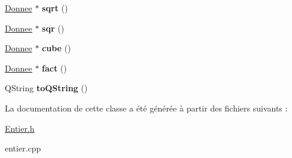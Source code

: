 \begin{DoxyCompactItemize}
\item 
\hypertarget{class_entier_a207294a4cb8da36d6ea5ab61a9dd29a5}{\hyperlink{class_donnee}{Donnee} $\ast$ {\bfseries sqrt} ()}\label{class_entier_a207294a4cb8da36d6ea5ab61a9dd29a5}

\item 
\hypertarget{class_entier_af2206ecf5e7d67b3643e656df2a9734c}{\hyperlink{class_donnee}{Donnee} $\ast$ {\bfseries sqr} ()}\label{class_entier_af2206ecf5e7d67b3643e656df2a9734c}

\item 
\hypertarget{class_entier_ad5e0a60bba1c266338add6f367fbe667}{\hyperlink{class_donnee}{Donnee} $\ast$ {\bfseries cube} ()}\label{class_entier_ad5e0a60bba1c266338add6f367fbe667}

\item 
\hypertarget{class_entier_acb2b2a359d83307b67eb2ef3b5295c03}{\hyperlink{class_donnee}{Donnee} $\ast$ {\bfseries fact} ()}\label{class_entier_acb2b2a359d83307b67eb2ef3b5295c03}

\item 
\hypertarget{class_entier_ac9aab0cb446a34eb806b4c242c9216f2}{Q\-String {\bfseries to\-Q\-String} ()}\label{class_entier_ac9aab0cb446a34eb806b4c242c9216f2}

\end{DoxyCompactItemize}


La documentation de cette classe a été générée à partir des fichiers suivants \-:\begin{DoxyCompactItemize}
\item 
\hyperlink{_entier_8h}{Entier.\-h}\item 
entier.\-cpp\end{DoxyCompactItemize}

